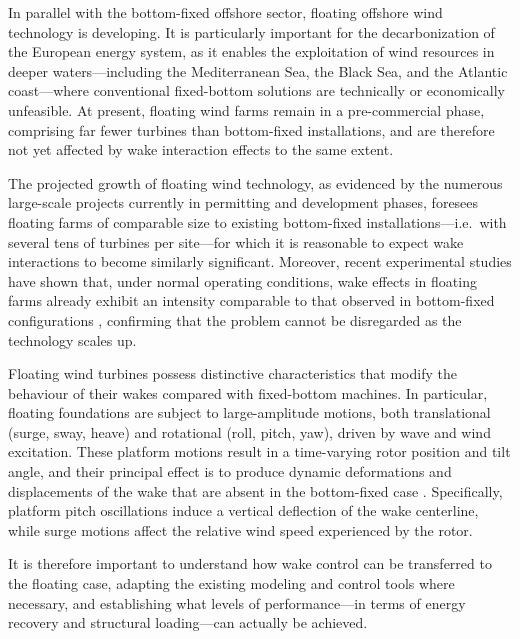 \documentclass[final,5p,times,twocolumn]{elsarticle}
\begin{document}
In parallel with the bottom-fixed offshore sector, floating offshore wind technology is developing. It is particularly important for the decarbonization of the European energy system, as it enables the exploitation of wind resources in deeper waters---including the Mediterranean Sea, the Black Sea, and the Atlantic coast---where conventional fixed-bottom solutions are technically or economically unfeasible. At present, floating wind farms remain in a pre-commercial phase, comprising far fewer turbines than bottom-fixed installations, and are therefore not yet affected by wake interaction effects to the same extent.

The projected growth of floating wind technology, as evidenced by the numerous large-scale projects currently in permitting and development phases, foresees floating farms of comparable size to existing bottom-fixed installations---i.e.\ with several tens of turbines per site---for which it is reasonable to expect wake interactions to become similarly significant. Moreover, recent experimental studies have shown that, under normal operating conditions, wake effects in floating farms already exhibit an intensity comparable to that observed in bottom-fixed configurations \cite{wes-10-1369-2025}, confirming that the problem cannot be disregarded as the technology scales up.

Floating wind turbines possess distinctive characteristics that modify the behaviour of their wakes compared with fixed-bottom machines. In particular, floating foundations are subject to large-amplitude motions, both translational (surge, sway, heave) and rotational (roll, pitch, yaw), driven by wave and wind excitation. These platform motions result in a time-varying rotor position and tilt angle, and their principal effect is to produce dynamic deformations and displacements of the wake that are absent in the bottom-fixed case \cite{wes-9-1827-2024, wes-10-1369-2025}. Specifically, platform pitch oscillations induce a vertical deflection of the wake centerline, while surge motions affect the relative wind speed experienced by the rotor.

It is therefore important to understand how wake control can be transferred to the floating case, adapting the existing modeling and control tools where necessary, and establishing what levels of performance---in terms of energy recovery and structural loading---can actually be achieved.
\end{document}
